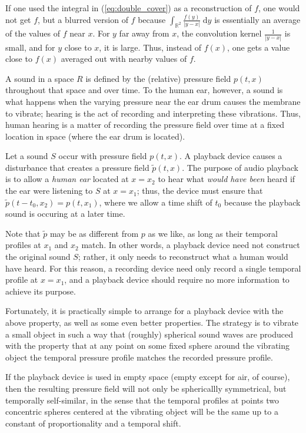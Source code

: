 \documentclass{homework}
\begin{document}
	 If one used the integral in (\ref{eq:double_cover}) as a reconstruction of \(f\), one would not get \(f\), but a blurred version of \(f\) because \(\int_{\mathbb{R}^2}\frac{f(y)}{\left|y-x\right|}\;\text{d}y\) is essentially an average of the values of \(f\) near \(x\). For \(y\) far away from \(x\), the convolution kernel \(\frac{1}{\left|y-x\right|}\) is small, and for \(y\) close to \(x\), it is large. Thus, instead of \(f(x)\), one gets a value close to \(f(x)\) averaged out with nearby values of \(f\).
	 
	 \question A sound in a space \(R\) is defined by the (relative) pressure field \(p(t, x)\) throughout that space and over time. To the human ear, however, a sound is what happens when the varying pressure near the ear drum causes the membrane to vibrate; hearing is the act of recording and interpreting these vibrations. Thus, human hearing is a matter of recording the pressure field over time at a fixed location in space (where the ear drum is located).

	 Let a sound \(S\) occur with pressure field \(p(t,x)\). A playback device causes a disturbance that creates a pressure field \(\tilde{p}(t,x)\). The purpose of audio playback is to allow a \textit{human ear} located at \(x=x_2\) to hear what \textit{would have been} heard if the ear were listening to \(S\) at \(x=x_1\); thus, the device must ensure that
	 \(\tilde{p}(t-t_0,x_2) = p(t, x_1)\), where we allow a time shift of \(t_0\) because the playback sound is occuring at a later time. 
	 
	 Note that \(\tilde{p}\) may be as different from \(p\) as we like, as long as their temporal profiles at \(x_1\) and \(x_2\) match. In other words, a playback device need not construct the original sound \(S\); rather, it only needs to reconstruct what a human would have heard. For this reason, a recording device need only record a single temporal profile at \(x=x_1\), and a playback device should require no more information to achieve its purpose.
	 
	 Fortunately, it is practically simple to arrange for a playback device with the above property, as well as some even better properties. The strategy is to vibrate a small object in such a way that (roughly) spherical sound waves are produced with the property that at any point on some fixed sphere around the vibrating object the temporal pressure profile matches the recorded pressure profile. 
	 
	 If the playback device is used in empty space (empty except for air, of course), then the resulting pressure field will not only be sphericallly symmetrical, but temporally self-similar, in the sense that the temporal profiles at points two concentric spheres centered at the vibrating object will be the same up to a constant of proportionality and a temporal shift.
	 
\end{document}
